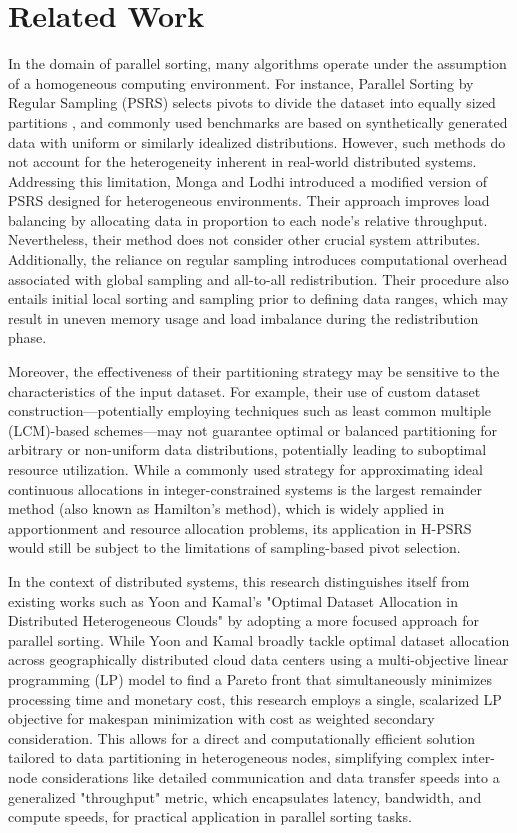 \documentclass[]{interact}
\theoremstyle{plain}
\theoremstyle{definition}
\theoremstyle{remark}
\begin{document}
\section{Related Work}
\label{sec:related_work}
In the domain of parallel sorting, many algorithms operate under the assumption of a homogeneous computing environment. For instance, Parallel Sorting by Regular Sampling (PSRS) selects pivots to divide the dataset into equally sized partitions \cite{tokuue_fugaku_2023}, and commonly used benchmarks are based on synthetically generated data with uniform or similarly idealized distributions. However, such methods do not account for the heterogeneity inherent in real-world distributed systems. Addressing this limitation, Monga and Lodhi \cite{monga_parallel_heterogeneous} introduced a modified version of PSRS designed for heterogeneous environments. Their approach improves load balancing by allocating data in proportion to each node’s relative throughput. Nevertheless, their method does not consider other crucial system attributes. Additionally, the reliance on regular sampling introduces computational overhead associated with global sampling and all-to-all redistribution. Their procedure also entails initial local sorting and sampling prior to defining data ranges, which may result in uneven memory usage and load imbalance during the redistribution phase.

Moreover, the effectiveness of their partitioning strategy may be sensitive to the characteristics of the input dataset. For example, their use of custom dataset construction—potentially employing techniques such as least common multiple (LCM)-based schemes—may not guarantee optimal or balanced partitioning for arbitrary or non-uniform data distributions, potentially leading to suboptimal resource utilization. While a commonly used strategy for approximating ideal continuous allocations in integer-constrained systems is the largest remainder method (also known as Hamilton's method), which is widely applied in apportionment and resource allocation problems, its application in H-PSRS would still be subject to the limitations of sampling-based pivot selection.

In the context of distributed systems, this research distinguishes itself from existing works such as Yoon and Kamal's "Optimal Dataset Allocation in Distributed Heterogeneous Clouds" \cite{yoon_optimal_2014} by adopting a more focused approach for parallel sorting. While Yoon and Kamal broadly tackle optimal dataset allocation across geographically distributed cloud data centers using a multi-objective linear programming (LP) model to find a Pareto front that simultaneously minimizes processing time and monetary cost, this research employs a single, scalarized LP objective for makespan minimization with cost as weighted secondary consideration. This allows for a direct and computationally efficient solution tailored to data partitioning in heterogeneous nodes, simplifying complex inter-node considerations like detailed communication and data transfer speeds into a generalized "throughput" metric, which encapsulates latency, bandwidth, and compute speeds, for practical application in parallel sorting tasks.
\end{document}
